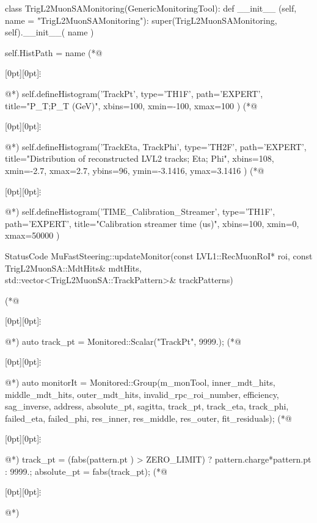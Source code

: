 \begin{python}[caption={Fragment kodu konfiguracji Athena Python~\cite{histogram-declaration}, zawierającego deklarację histogramów przedstawionych na rysunkach~\ref{fig:athena:histogram_TH1},~\ref{fig:athena:histogram_TH1_time}~i~\ref{fig:athena:histogram_TH2}.}, label={lst:athena:histogram_declaration}]
class TrigL2MuonSAMonitoring(GenericMonitoringTool):
    def __init__ (self, name = "TrigL2MuonSAMonitoring"):
        super(TrigL2MuonSAMonitoring, self).__init__( name )
    
        self.HistPath = name
(*@\centerline{\raisebox{-1pt}[0pt][0pt]{$\vdots$}}@*)
        self.defineHistogram('TrackPt', type='TH1F', path='EXPERT', title="P_{T};P_{T} (GeV)", xbins=100, xmin=-100, xmax=100 )
(*@\centerline{\raisebox{-1pt}[0pt][0pt]{$\vdots$}}@*)
        self.defineHistogram('TrackEta, TrackPhi', type='TH2F', path='EXPERT', title="Distribution of reconstructed LVL2 tracks; Eta; Phi", xbins=108, xmin=-2.7, xmax=2.7, ybins=96, ymin=-3.1416, ymax=3.1416 )
(*@\centerline{\raisebox{-1pt}[0pt][0pt]{$\vdots$}}@*)
        self.defineHistogram('TIME_Calibration_Streamer', type='TH1F', path='EXPERT', title="Calibration streamer time (us)", xbins=100, xmin=0, xmax=50000 )
\end{python}

\begin{cpp}[caption={Fragment kodu algorytmu~\cite{histogram-fill}, odpowiadającego za wypełnienie histogramu przedstawionego na rysunku~\ref{fig:athena:histogram_TH1}, za pomocą zmiennej monitorowanej `TrackPt`.}, label={lst:athena:track_pt}]
StatusCode MuFastSteering::updateMonitor(const LVL1::RecMuonRoI* roi,
  const TrigL2MuonSA::MdtHits& mdtHits,
  std::vector<TrigL2MuonSA::TrackPattern>& trackPatterns)
{
(*@\centerline{\raisebox{-1pt}[0pt][0pt]{$\vdots$}}@*)
  auto track_pt 	= Monitored::Scalar("TrackPt", 9999.);
(*@\centerline{\raisebox{-1pt}[0pt][0pt]{$\vdots$}}@*)
  auto monitorIt	= Monitored::Group(m_monTool, inner_mdt_hits, middle_mdt_hits, outer_mdt_hits, invalid_rpc_roi_number, efficiency, sag_inverse, address, absolute_pt, sagitta, track_pt, track_eta, track_phi, failed_eta, failed_phi, res_inner, res_middle, res_outer, fit_residuals);
(*@\centerline{\raisebox{-1pt}[0pt][0pt]{$\vdots$}}@*)
  track_pt = (fabs(pattern.pt ) > ZERO_LIMIT) ? pattern.charge*pattern.pt : 9999.;
  absolute_pt = fabs(track_pt);
(*@\centerline{\raisebox{-1pt}[0pt][0pt]{$\vdots$}}@*)
}
\end{cpp}

